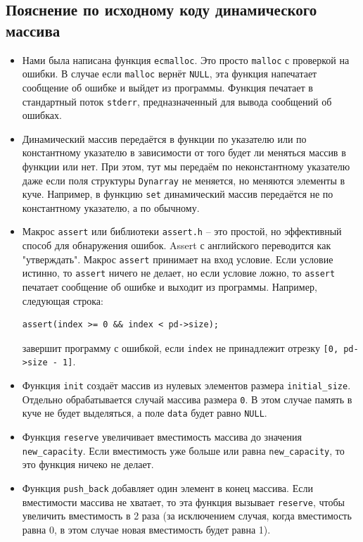 \documentclass[10pt]{article}
\begin{document}
\newpage
\subsection*{Пояснение по исходному коду динамического массива}

\begin{itemize}
\item Нами была написана функция \texttt{ecmalloc}. Это просто \texttt{malloc} с проверкой на ошибки. В случае если \texttt{malloc} вернёт \texttt{NULL}, эта функция напечатает сообщение об ошибке и выйдет из программы. Функция печатает в стандартный поток \texttt{stderr}, предназначенный для вывода сообщений об ошибках.

\item Динамический массив передаётся в функции по указателю или по константному указателю в зависимости от того будет ли меняться массив в функции или нет. При этом, тут мы передаём по неконстантному указателю даже если поля структуры \texttt{Dynarray} не меняется, но меняются элементы в куче. Например, в функцию \texttt{set} динамический массив передаётся не по константному указателю, а по обычному.

\item Макрос \texttt{assert} или библиотеки \texttt{assert.h} -- это простой, но эффективный способ для обнаружения ошибок. Assert с английского переводится как "утверждать". Макрос \texttt{assert} принимает на вход условие. Если условие истинно, то \texttt{assert} ничего не делает, но если условие ложно, то \texttt{assert} печатает сообщение об ошибке и выходит из программы. Например, следующая строка:
\begin{lstlisting}
assert(index >= 0 && index < pd->size);
\end{lstlisting}
завершит программу с ошибкой, если \texttt{index} не принадлежит отрезку \texttt{[0, pd->size - 1]}.


\item Функция \texttt{init} создаёт массив из нулевых элементов размера \texttt{initial\_size}. Отдельно обрабатывается случай массива размера \texttt{0}. В этом случае память в куче не будет выделяться, а поле \texttt{data} будет равно \texttt{NULL}.

\item Функция \texttt{reserve} увеличивает вместимость массива до значения \texttt{new\_capacity}. Если вместимость уже больше или равна \texttt{new\_capacity}, то это функция ничеко не делает.

\item Функция \texttt{push\_back} добавляет один элемент в конец массива. Если вместимости массива не хватает, то эта функция вызывает \texttt{reserve}, чтобы увеличить вместимость в 2 раза (за исключением случая, когда вместимость равна 0, в этом случае новая вместимость будет равна 1). 
\end{itemize}
\end{document}
